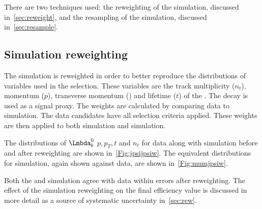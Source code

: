 There are two techniques used: the reweighting of the simulation, discussed in~\autoref{sec:reweight}, and the resampling of the simulation, discussed in~\autoref{sec:resample}.

\subsection{Simulation reweighting}
\label{sec:reweight}
The simulation is reweighted in order to better reproduce the distributions of variables used in the selection. These variables are the track multiplicity ($n_{t}$), momentum ($p$), transverse momentum (\pt) and lifetime ($t$) of the \Lb. The \Lbpijpsi decay is used as a signal proxy. The weights are calculated by comparing \Lbpijpsi data to \Lbpijpsi simulation. The \Lbpijpsi data candidates have all selection criteria applied. These weights are then applied to both \Lbpijpsi simulation and \Lbpi simulation.


The distributions of $\Lb$ $p, p_{T}, t$ and $n_{t}$ for \Lbpijpsi data along with \Lbpijpsi simulation before and after reweighting are shown in~\autoref{Fig:jpsijpsiw}.  The equivalent distributions for \Lbpi simulation, again shown against \Lbpijpsi data, are shown in~\autoref{Fig:mumjpsiw}. %

Both the \Lbpi and \Lbpijpsi simulation agree with \Lbpijpsi data within errors after reweighting. The effect of the simulation reweighting on the final efficiency value is discussed in more detail as a source of systematic uncertainty in~\autoref{sec:rew}.



